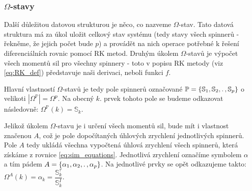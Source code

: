 \clearpage

\DFNtrysingle
\DFNinhibitcbreak
{}\textwidth

\subsubsection{$\Omega$-stavy}

Další důležitou datovou strukturou je něco, co nazveme $\Omega$-stav. Tato datová struktura má za úkol uložit celkový stav systému (tedy stavy všech spinnerů - řekněme, že jejich počet bude $p$) a provádět na nich operace potřebné k řešení diferenciálních rovnic pomocí RK metod. Druhým úkolem $\Omega$-stavů je výpočet všech momentů sil pro všechny spinnery - toto v popisu RK metody (viz \autoref{eq:RK_def}) představuje naši derivaci, neboli funkci $f$.

Hlavní vlastností $\Omega$-stavů je tedy pole spinnerů označované $\mathbb{P} = \{ \mathbb{S}_1, \mathbb{S}_2, \ldotp ,\mathbb{S}_p \}$ o velikoti $|\Omega_{}^{\mathbb{P}}| = \Omega_{}^{p}$. Na obecný $k$. prvek tohoto pole se budeme odkazovat následovně: $\Omega_{}^{\mathbb{P}}(k) = \mathbb{S}_k$.

Jelikož úkolem $\Omega$-stavu je i určení všech momentů sil, bude mít i vlastnost značenou $A$, což je pole dopočítaných úhlových zrychlení jednotlivých spinnerů. Pole $A$ tedy ukládá všechna vypočtená úhlová zrychlení všech spinnerů, která získáme z rovnice \ref{eq:sim_equations}. Jednotlivá zrychlení označíme symbolem $\alpha$ a tím pádem $A = \{ \alpha_1, \alpha_2, \ldotp, \alpha_p \} $. Na jednotlivé prvky se opět odkazujeme takto: $\Omega_{}^{A}(k) = \alpha_k = \dfrac{\mathbb{S}_k^\tau}{\mathbb{S}_k^I}$.

